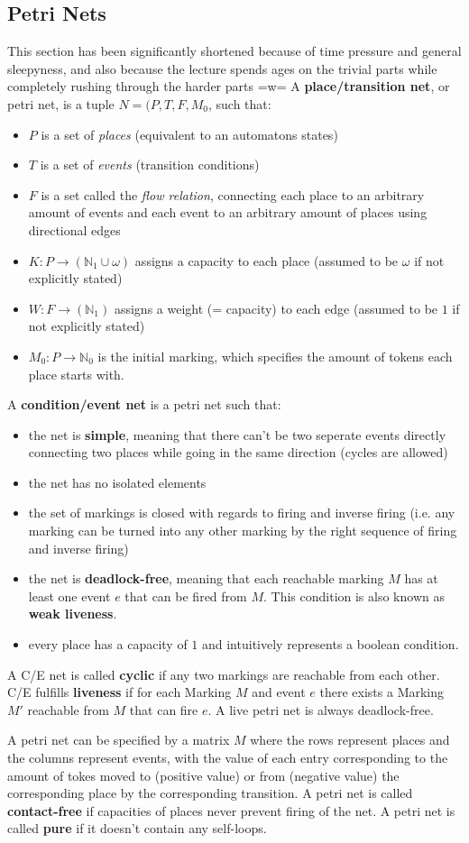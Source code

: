 \documentclass{report}
\newcommand{\tbf}{\textbf}
\newcommand*{\newpar}{\par\vspace{\baselineskip}\noindent} %
\begin{document}
\subsection{Petri Nets}
This section has been significantly shortened because of time pressure and general sleepyness, and also because the lecture spends ages on the trivial parts while completely rushing through the harder parts =w=
\newpage
A \tbf{place/transition net}, or petri net, is a tuple $N = (P, T, F, M_0$, such that:
\begin{itemize}
 \item $P$ is a set of \textit{places} (equivalent to an automatons states)
 \item $T$ is a set of \textit{events} (transition conditions)
 \item $F$ is a set called the \textit{flow relation}, connecting each place to an arbitrary amount of events and each event to an arbitrary amount of places using directional edges
 \item $K: P \to (\mathbb{N}_1 \cup \omega)$ assigns a capacity to each place (assumed to be $\omega$ if not explicitly stated)
 \item $W: F \to (\mathbb{N}_1)$ assigns a weight (= capacity) to each edge (assumed to be $1$ if not explicitly stated)
 \item $M_0: P \to \mathbb{N}_0$ is the initial marking, which specifies the amount of tokens each place starts with.
\end{itemize}
\newpar
A \tbf{condition/event net} is a petri net such that:
\begin{itemize}
 \item the net is \tbf{simple}, meaning that there can't be two seperate events directly connecting two places while going in the same direction (cycles are allowed)
 \item the net has no isolated elements
 \item the set of markings is closed with regards to firing and inverse firing (i.e. any marking can be turned into any other marking by the right sequence of firing and inverse firing)
 \item the net is \tbf{deadlock-free}, meaning that each reachable marking $M$ has at least one event $e$ that can be fired from $M$. This condition is also known as \tbf{weak liveness}.
 \item every place has a capacity of $1$ and intuitively represents a boolean condition.
\end{itemize}
A C/E net is called \tbf{cyclic} if any two markings are reachable from each other. C/E fulfills \tbf{liveness} if for each Marking $M$ and event $e$ there exists a Marking $M'$ reachable from $M$ that can fire $e$. A live petri net is always deadlock-free.
\newpar
A petri net can be specified by a matrix $M$ where the rows represent places and the columns represent events, with the value of each entry corresponding to the amount of tokes moved to (positive value) or from (negative value) the corresponding place by the corresponding transition. A petri net is called \tbf{contact-free} if capacities of places never prevent firing of the net. A petri net is called \tbf{pure} if it doesn't contain any self-loops.
%
\end{document}
